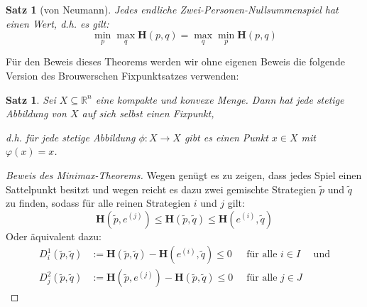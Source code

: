 \documentclass[a4paper,ngerman,12pt,bibtotoc]{scrartcl}
\theoremstyle{definition}
\theoremstyle{plain}
\newtheorem{satz}[defn]{Satz}
\theoremstyle{remark}
\newcommand{\RR}{\mathbb{R}}
\renewcommand{\_}{\mathpunct{.}\,}
\newcommand{\?}{\,{:}\,}
\renewcommand{\sp}{\tilde{p}}		%
\newcommand{\sq}{\tilde{q}}		%
\newcommand{\EH}{\boldsymbol{H}}
\newcommand{\ZPNS}{Zwei-Personen-Nullsummenspiel }
\begin{document}
	\begin{satz}[von Neumann]
		Jedes endliche \ZPNS hat einen Wert, d.h. es gilt:
			\[\min_p \max_q \EH(p,q) = \max_q \min_p \EH(p,q)\]
	\end{satz}
	
	Für den Beweis dieses Theorems werden wir ohne eigenen Beweis die folgende Version des Brouwerschen Fixpunktsatzes verwenden:
	
	\begin{satz}
		Sei $X\subseteq\RR^n$ eine kompakte und konvexe Menge. Dann hat jede stetige Abbildung von $X$ auf sich selbst einen Fixpunkt, 
		
		d.h. für jede stetige Abbildung $\phi: X \to X$ gibt es einen Punkt $x\in X$ mit $\varphi(x) = x$.
	\end{satz}
	
	\begin{proof}[Beweis des Minimax-Theorems]
		Wegen  genügt es zu zeigen, dass jedes Spiel einen Sattelpunkt besitzt und wegen  reicht es dazu zwei gemischte Strategien $\sp$ und $\sq$ zu finden, sodass für alle reinen Strategien $i$ und $j$ gilt:
			\[\EH(\sp,e^{(j)}) \leq \EH(\sp,\sq) \leq \EH(e^{(i)},\sq)\]
		Oder äquivalent dazu:
			\begin{equation}\begin{aligned}\label{eq:vonNeumannHilfs}
				D^1_i(\sp,\sq) &:= \EH(\sp,\sq) - \EH(e^{(i)},\sq) \leq 0 ~&\text{ für alle } i \in I& \text{ und}\\
				D^2_j(\sp,\sq) &:= \EH(\sp,e^{(j)}) - \EH(\sp,\sq) \leq 0 ~&\text{ für alle } j \in J&
			\end{aligned}\end{equation}
			

\end{proof}
\end{document}
